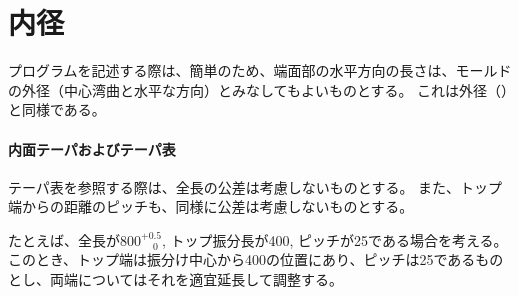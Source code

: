 \section{内径}
プログラムを記述する際は、簡単のため、端面部の水平方向の長さは、モールドの外径（中心湾曲と水平な方向）とみなしてもよいものとする。
これは外径（）と同様である。

\paragraph{内面テーパおよびテーパ表}\noindent
テーパ表を参照する際は、全長の公差は考慮しないものとする。
また、トップ端からの距離のピッチも、同様に公差は考慮しないものとする。

たとえば、全長が$800^{+0.5}_{\phantom -0}$, トップ振分長が400, ピッチが25である場合を考える。
このとき、トップ端は振分け中心から400の位置にあり、ピッチは25であるものとし、両端についてはそれを適宜延長して調整する。
